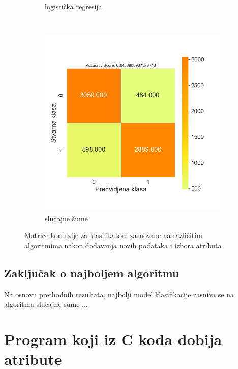 \documentclass[12pt,oneside]{memoir}
\begin{document}
\begin{figure}[!ht]
\begin{subfigure}[b]{0.45\textwidth}
        \caption{logistička regresija}
        \label{fig:logreg4}
    \end{subfigure}
    \\
    \begin{subfigure}[b]{0.45\textwidth}
        \centering
        \includegraphics[width=\textwidth]{RF_feature_selection_oversampled_confussion_matrix}
        \caption{slučajne šume}
        \label{fig:randfor4}
    \end{subfigure}
    \caption{Matrice konfuzije za klasifikatore zasnovane na različitim algoritmima nakon dodavanja novih podataka i izbora atributa}
    \label{fig:confmatroversfeatsel}
\end{figure}

% 

\subsection{Zaključak o najboljem algoritmu}
Na osnovu prethodnih rezultata, najbolji model klasifikacije zasniva se na algoritmu slucajne sume ...


\section{Program koji iz C koda dobija atribute}
\end{document}
